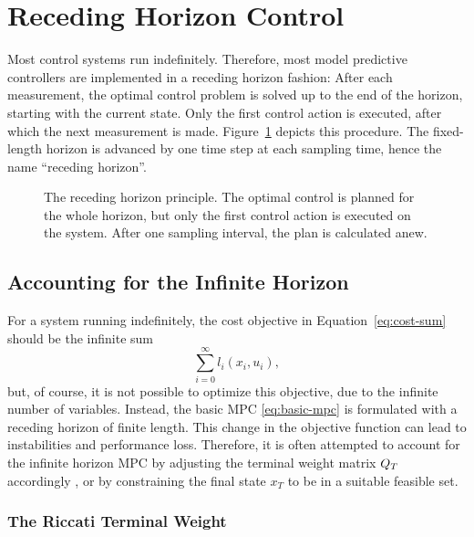 \section{Receding Horizon Control}
\label{sec:receding-horizon}

Most control systems run indefinitely. Therefore, most model predictive
controllers are implemented in a  receding horizon fashion: After each
measurement, the optimal control problem is solved up to the end of the horizon,
starting with the current state. Only the first control action is executed,
after which the next measurement is made. Figure~\ref{fig:receding-horizon}
depicts this procedure. The fixed-length horizon is advanced by one time step at
each sampling time, hence the name ``receding horizon''.

\begin{figure}
  \caption[The receding horizon principle.]{The receding horizon principle. The
optimal control is planned for the whole horizon, but only the first control
action is executed on the system. After one sampling interval, the plan is
calculated anew.}
  \label{fig:receding-horizon}
\end{figure}

\subsection{Accounting for the Infinite Horizon}
\label{sec:infinite-horizon}

For a system running indefinitely, the cost objective in
Equation~\eqref{eq:cost-sum} should be the infinite sum
\begin{equation}
  \sum_{i=0}^\infty l_i(x_i, u_i),
\end{equation}
but, of course, it is not possible to optimize this objective, due to the
infinite number of variables. Instead, the basic MPC \eqref{eq:basic-mpc} is
formulated with a receding horizon of finite length. This change in the
objective function can lead to instabilities and performance loss. Therefore, it
is often attempted to account for the infinite horizon MPC by adjusting the
terminal weight matrix $Q_T$ accordingly
\cite[]{Maciejowski:2002:Predictive}, or by constraining the final state
$x_T$ to be in a suitable feasible set.

\subsubsection{The Riccati Terminal Weight}

